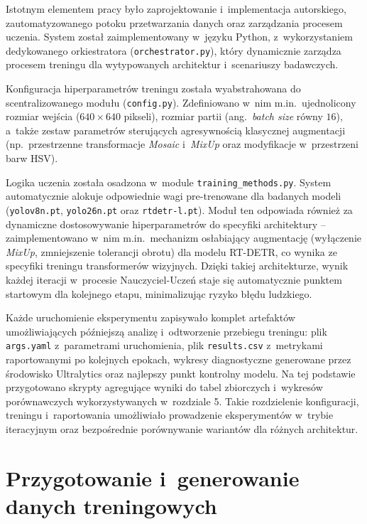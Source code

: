 Istotnym elementem pracy było zaprojektowanie i~implementacja autorskiego, zautomatyzowanego potoku przetwarzania danych oraz zarządzania procesem uczenia. System został zaimplementowany w~języku Python, z~wykorzystaniem dedykowanego orkiestratora (\texttt{orchestrator.py}), który dynamicznie zarządza procesem treningu dla wytypowanych architektur i~scenariuszy badawczych. 

Konfiguracja hiperparametrów treningu została wyabstrahowana do scentralizowanego modułu (\texttt{config.py}). Zdefiniowano w~nim m.in.\ ujednolicony rozmiar wejścia ($640 \times 640$ pikseli), rozmiar partii (ang.\ \emph{batch size} równy $16$), a~także zestaw parametrów sterujących agresywnością klasycznej augmentacji (np.\ przestrzenne transformacje \emph{Mosaic} i~\emph{MixUp} oraz modyfikacje w~przestrzeni barw HSV).

Logika uczenia została osadzona w~module \texttt{training\_methods.py}. System automatycznie alokuje odpowiednie wagi pre-trenowane dla badanych modeli (\texttt{yolov8n.pt}, \texttt{yolo26n.pt} oraz \texttt{rtdetr-l.pt}). Moduł ten odpowiada również za dynamiczne dostosowywanie hiperparametrów do specyfiki architektury -- zaimplementowano w~nim m.in.\ mechanizm osłabiający augmentację (wyłączenie \emph{MixUp}, zmniejszenie tolerancji obrotu) dla modelu RT-DETR, co wynika ze specyfiki treningu transformerów wizyjnych. Dzięki takiej architekturze, wynik każdej iteracji w~procesie Nauczyciel-Uczeń staje się automatycznie punktem startowym dla kolejnego etapu, minimalizując ryzyko błędu ludzkiego.

Każde uruchomienie eksperymentu zapisywało komplet artefaktów umożliwiających późniejszą analizę i~odtworzenie przebiegu treningu: plik \texttt{args.yaml} z~parametrami uruchomienia, plik \texttt{results.csv} z~metrykami raportowanymi po kolejnych epokach, wykresy diagnostyczne generowane przez środowisko Ultralytics oraz najlepszy punkt kontrolny modelu. Na tej podstawie przygotowano skrypty agregujące wyniki do tabel zbiorczych i~wykresów porównawczych wykorzystywanych w~rozdziale 5. Takie rozdzielenie konfiguracji, treningu i~raportowania umożliwiało prowadzenie eksperymentów w~trybie iteracyjnym oraz bezpośrednie porównywanie wariantów dla różnych architektur.

\section{Przygotowanie i~generowanie danych treningowych}

